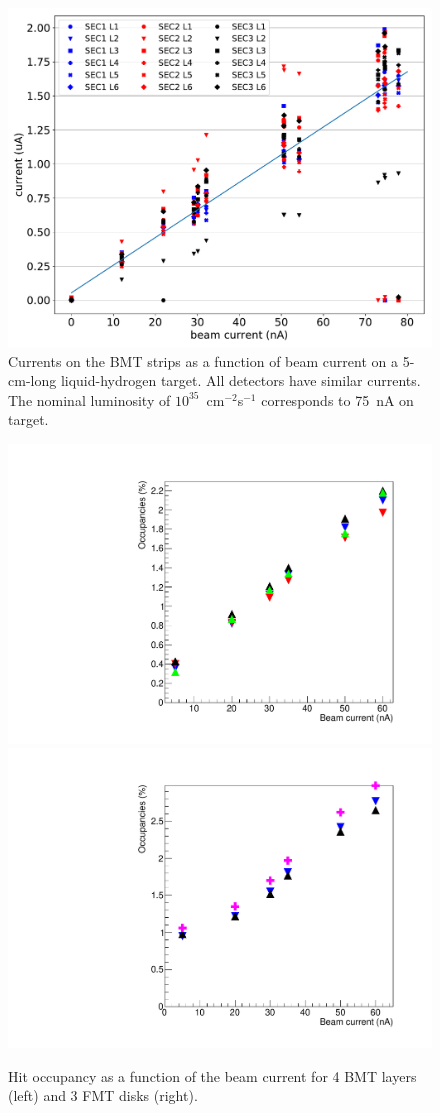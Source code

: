 \begin{figure}[htb]
 \includegraphics[width=1.0\columnwidth,keepaspectratio]{images/BMT_IvsLumi}
 \caption{Currents on the BMT strips as a function of beam current on a 5-cm-long liquid-hydrogen target. All detectors have similar
   currents. The nominal luminosity of $10^{35}$~cm$^{-2}$s$^{-1}$ corresponds to 75~nA on target.}
 \label{fig:mm-fig14}
\end{figure}

\begin{figure}[htb]
 \includegraphics[width=.49\columnwidth,keepaspectratio]{images/OccupanciesVSbeamCurrent_BMT_only4Layers.pdf}
 \includegraphics[width=.49\columnwidth,keepaspectratio]{images/OccupanciesVSbeamCurrent_FMT_only3Layers.pdf}
 \caption{Hit occupancy as a function of the beam current for 4 BMT layers (left) and 3 FMT disks (right).}
 \label{fig:mm-fig16}
\end{figure}

